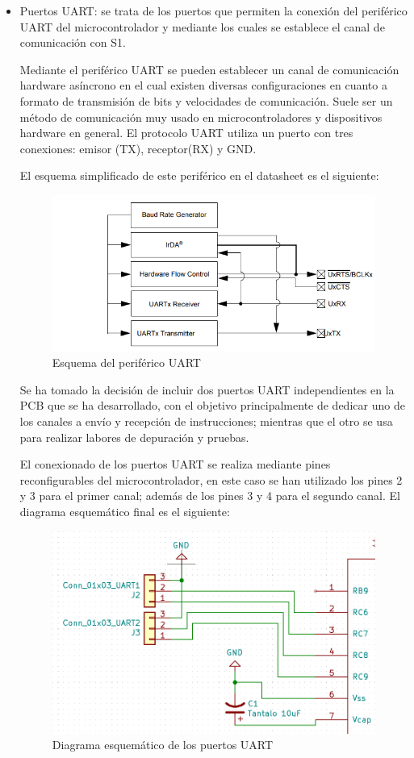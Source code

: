 \begin{itemize}
    \item Puertos UART: se trata de los puertos que permiten la conexión del periférico UART del microcontrolador y mediante los cuales se establece el canal de comunicación con S1.
    
    Mediante el periférico UART se pueden establecer un canal de comunicación hardware asíncrono en el cual existen diversas configuraciones en cuanto a formato de transmisión de bits y velocidades de comunicación. Suele ser un método de comunicación muy usado en microcontroladores y dispositivos hardware en general. El protocolo UART utiliza un puerto con tres conexiones: emisor (TX), receptor(RX) y GND.
    
    El esquema simplificado de este periférico en el datasheet es el siguiente:
    
    \begin{figure}[H]
    \centering 
    \includegraphics[width=.6\linewidth]{pictures/UARTdatasheet.PNG}
    \caption{Esquema del periférico UART}
    \label{fig:kdiagram}
    \end{figure}
    
    Se ha tomado la decisión de incluir dos puertos UART independientes en la PCB que se ha desarrollado, con el objetivo principalmente de dedicar uno de los canales a envío y recepción de instrucciones; mientras que el otro se usa para realizar labores de depuración y pruebas.
    
    El conexionado de los puertos UART  se realiza mediante pines reconfigurables del microcontrolador, en este caso se han utilizado los pines 2 y 3 para el primer canal; además de los pines 3 y 4 para el segundo canal. El diagrama esquemático final es el siguiente:
    
    \begin{figure}[H]
    \centering 
    \includegraphics[width=.6\linewidth]{pictures/UART.PNG}
    \caption{Diagrama esquemático de los puertos UART}
    \label{fig:kdiagram}
    \end{figure}
    

\end{itemize}
